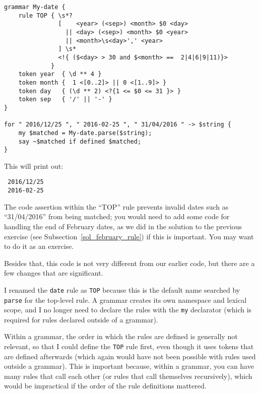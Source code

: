 \label{dategrammar}
\begin{verbatim}
grammar My-date {
    rule TOP { \s*? 
               [    <year> (<sep>) <month> $0 <day>
                 || <day> (<sep>) <month> $0 <year> 
                 || <month>\s<day>',' <year>                     
               ] \s* 
               <!{ ($<day> > 30 and $<month> ==  2|4|6|9|11)}>  
             }
    token year  { \d ** 4 }                                        
    token month {  1 <[0..2]> || 0 <[1..9]> }                
    token day   { (\d ** 2) <?{1 <= $0 <= 31 }> }  
    token sep   { '/' || '-' } 
}                         

for " 2016/12/25 ", " 2016-02-25 ", " 31/04/2016 " -> $string {
	my $matched = My-date.parse($string);
	say ~$matched if defined $matched;
}
\end{verbatim}

This will print out:
\begin{verbatim}
 2016/12/25
 2016-02-25
\end{verbatim}

The code assertion within the ``TOP'' rule prevents invalid 
dates such as ``31/04/2016'' from being matched; you would 
need to add some code for handling the end of February dates,
as we did in the solution to the previous exercise (see 
Subsection~\ref{sol_february_rule}) if this is important. You may 
want to do it as an exercise.

Besides that, this code is not very different from our 
earlier code, but there are a few changes that are 
significant.


I renamed the {\tt date} rule as {\tt TOP} because this 
is the default name searched by {\tt parse} for the top-level 
rule. A grammar creates its own namespace and 
lexical scope, and I no longer need to declare the rules 
with the {\tt my} declarator (which is required for
rules declared outside of a grammar). 

Within a grammar, the order in which the rules are 
defined is generally not relevant, so that I could define 
the {\tt TOP} rule first, even though it uses tokens 
that are defined afterwards (which again would have not 
been possible with rules used outside a grammar). This is 
important because, within a grammar, you can have many rules 
that call each other (or rules that call themselves 
recursively), which would be impractical if the order of 
the rule definitions mattered.


